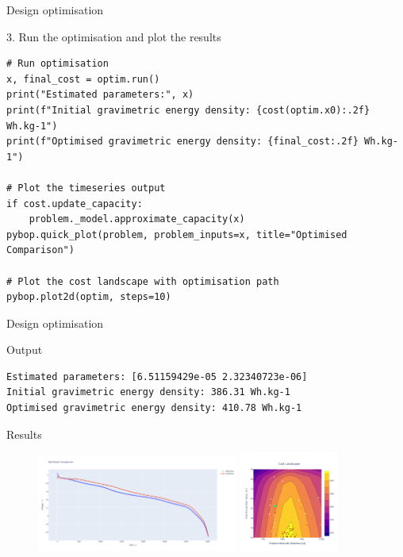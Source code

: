 \documentclass[aspectratio=169]{beamer}
\begin{document}
\begin{frame}[fragile,t]{Design optimisation}
    \vspace{-2cm}
    \begin{block}{3. Run the optimisation and plot the results}
    \begin{lstlisting}[firstnumber=1, xleftmargin=10pt]
# Run optimisation
x, final_cost = optim.run()
print("Estimated parameters:", x)
print(f"Initial gravimetric energy density: {cost(optim.x0):.2f} Wh.kg-1")
print(f"Optimised gravimetric energy density: {final_cost:.2f} Wh.kg-1")

# Plot the timeseries output
if cost.update_capacity:
    problem._model.approximate_capacity(x)
pybop.quick_plot(problem, problem_inputs=x, title="Optimised Comparison")

# Plot the cost landscape with optimisation path
pybop.plot2d(optim, steps=10)
    \end{lstlisting}
    \end{block}
\end{frame}

\begin{frame}[fragile,t]{Design optimisation}
    \vspace{-6mm}
    \begin{block}{Output}
    \begin{lstlisting}[firstnumber=1, xleftmargin=10pt]
Estimated parameters: [6.51159429e-05 2.32340723e-06]
Initial gravimetric energy density: 386.31 Wh.kg-1
Optimised gravimetric energy density: 410.78 Wh.kg-1
    \end{lstlisting}
    \end{block}
    Results
    \vspace{-3mm}
    \begin{figure}
        \centering
        \includegraphics[width=0.59\textwidth, trim={0 0 0 0},clip]{Images/Examples/MaxEnergy_quick_plot.png}
        \includegraphics[width=0.29\textwidth, trim={0 0 0 0},clip]{Images/Examples/MaxEnergy_cost_trace.png} \\
        \label{fig:design_optimisation}
    \end{figure}
\end{frame}
\end{document}
